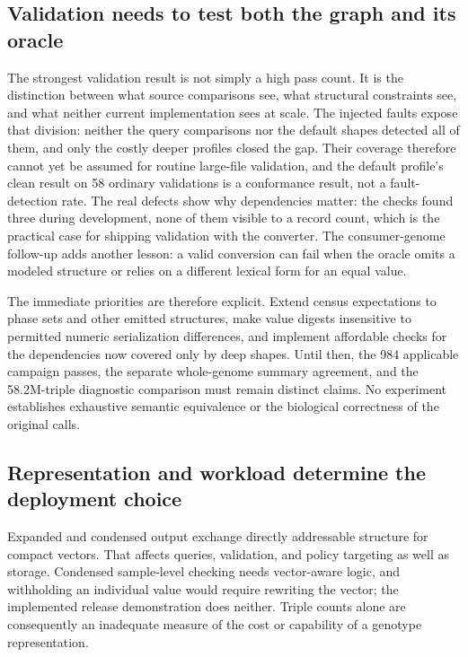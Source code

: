 \documentclass[pdflatex,sn-mathphys-num]{sn-jnl}
\begin{document}
\subsection{Validation needs to test both the graph and its oracle}\label{subsec4.1}
The strongest validation result is not simply a high pass count. 
It is the distinction between what source comparisons see, what structural constraints see, and what neither current implementation sees at scale. 
The injected faults expose that division: neither the query comparisons nor the default shapes detected all of them, and only the costly deeper profiles closed the gap. 
Their coverage therefore cannot yet be assumed for routine large-file validation, and the default profile's clean result on 58 ordinary validations is a conformance result, not a fault-detection rate. 
The real defects show why dependencies matter: the checks found three during development, none of them visible to a record count, which is the practical case for shipping validation with the converter. 
The consumer-genome follow-up adds another lesson: a valid conversion can fail when the oracle omits a modeled structure or relies on a different lexical form for an equal value.

The immediate priorities are therefore explicit. 
Extend census expectations to phase sets and other emitted structures, make value digests insensitive to permitted numeric serialization differences, and implement affordable checks for the dependencies now covered only by deep shapes. 
Until then, the 984 applicable campaign passes, the separate whole-genome summary agreement, and the 58.2M-triple diagnostic comparison must remain distinct claims. 
No experiment establishes exhaustive semantic equivalence or the biological correctness of the original calls.

\subsection{Representation and workload determine the deployment choice}\label{subsec4.2}
Expanded and condensed output exchange directly addressable structure for compact vectors. 
That affects queries, validation, and policy targeting as well as storage. 
Condensed sample-level checking needs vector-aware logic, and withholding an individual value would require rewriting the vector; the implemented release demonstration does neither. 
Triple counts alone are consequently an inadequate measure of the cost or capability of a genotype representation.
\end{document}
